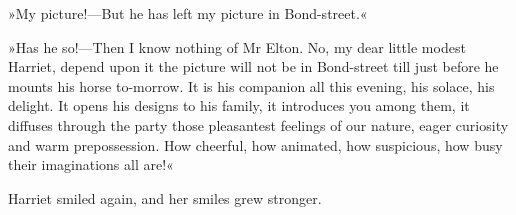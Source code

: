 »My picture!—But he has left my picture in Bond-street.«

»Has he so!—Then I know nothing of Mr Elton. No, my dear little modest Harriet, depend upon it the picture will not be in Bond-street till just before he mounts his horse to-morrow. It is his companion all this evening, his solace, his delight. It opens his designs to his family, it introduces you among them, it diffuses through the party those pleasantest feelings of our nature, eager curiosity and warm prepossession. How cheerful, how animated, how suspicious, how busy their imaginations all are!«

Harriet smiled again, and her smiles grew stronger.
